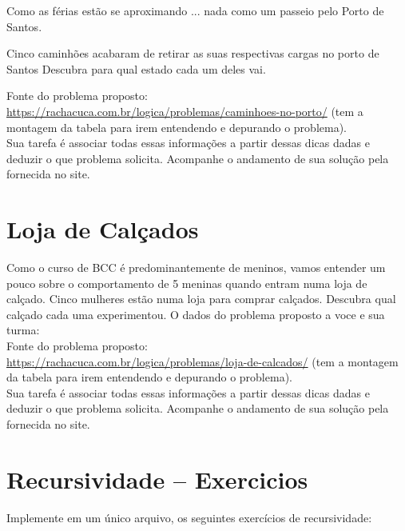 \documentclass[a4paper,12pt]{article}
\begin{document}
Como as férias estão se aproximando ... nada como um passeio
pelo Porto de Santos.

Cinco caminhões acabaram de retirar as suas respectivas cargas no porto de Santos
Descubra para qual estado cada um deles vai.

 Fonte do problema proposto:\\
  \url{https://rachacuca.com.br/logica/problemas/caminhoes-no-porto/}
 (tem a montagem da tabela para irem entendendo e depurando o problema).\\


\vspace{1.5cm}
 Sua tarefa é associar todas essas informações a partir dessas dicas dadas e deduzir
 o que problema solicita. Acompanhe o andamento de sua solução pela fornecida no site.
\newpage
\section{Loja de Calçados}

Como o curso de BCC é predominantemente de meninos, vamos entender um pouco
sobre o comportamento de 5 meninas quando entram numa loja de calçado.
Cinco mulheres estão numa loja para comprar calçados. 
Descubra qual calçado cada uma experimentou. O dados do 
problema proposto a voce e sua turma:\\
 Fonte do problema proposto:\\
   \url{https://rachacuca.com.br/logica/problemas/loja-de-calcados/}
 (tem a montagem da tabela para irem entendendo e depurando o problema).\\


\vspace{1.5cm}
 Sua tarefa é associar todas essas informações a partir dessas dicas dadas e deduzir o que problema solicita. Acompanhe o andamento de sua solução pela fornecida no site.
\newpage
\section{Recursividade -- Exercicios}


Implemente em um único arquivo, os seguintes exercícios
de recursividade:
\end{document}
